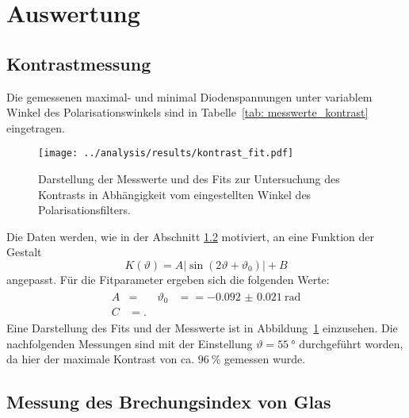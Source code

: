 \section{Auswertung}


\subsection{Kontrastmessung}
Die gemessenen maximal- und minimal Diodenspannungen unter variablem Winkel des Polarisationswinkels sind in 
Tabelle~\ref{tab: messwerte_kontrast} eingetragen.




\begin{figure}
    \centering
    \texttt{[image: ../analysis/results/kontrast\_fit.pdf]}
    \label{fig: kontrast_fit}
    \caption{Darstellung der Messwerte und des Fits zur Untersuchung des Kontrasts in Abhängigkeit vom eingestellten Winkel des Polarisationsfilters.}
\end{figure}

Die Daten werden, wie in der Abschnitt \ref{} motiviert, an eine Funktion der Gestalt
\begin{equation}
    K(\vartheta) = A \left|\sin \left(2 \vartheta + \vartheta_0 \right)\right| + B 
\end{equation}
angepasst. Für die Fitparameter ergeben sich die folgenden Werte:
\begin{align}
    \begin{aligned}
    A &=  \quad  & \vartheta_0 &=  = \SI{-0.092(21)}{\radian} \\ 
    C &= .
    \end{aligned}
\end{align}
Eine Darstellung des Fits und der Messwerte ist in Abbildung~\ref{fig: kontrast_fit} einzusehen.
Die nachfolgenden Messungen sind mit der Einstellung $\vartheta = \SI{55}{\degree}$ durchgeführt worden, da hier der maximale 
Kontrast von ca. $\SI{96}{\percent}$ gemessen wurde.  



\subsection{Messung des Brechungsindex von Glas}




